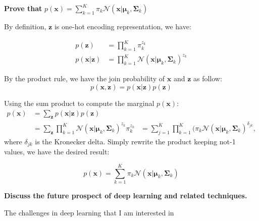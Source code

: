 \documentclass[12pt,twoside]{article}
\begin{document}
\begin{exercises}

\problem \textbf{Prove that} $p(\mathbf{x}) = \sum_{k=1}^{K} \pi_k \mathcal{N}(\mathbf{x}|\boldsymbol \mu_k,\boldsymbol \Sigma_k)$

\ifsolution \solution{}
By definition, $\mathbf{z}$ is one-hot encoding representation, we have:

\begin{equation*}
  \begin{aligned}
    p(\mathbf{z}) & = \prod^{K}_{k=1} \pi_k^{z_k} \\
    p(\mathbf{x}|\mathbf{z}) & = \prod^{K}_{k=1} \mathcal{N} (\mathbf{x}|\boldsymbol \mu_k, \boldsymbol \Sigma_k)^{z_k}
  \end{aligned}
\end{equation*}

By the product rule, we have the join probability of $\mathbf{x}$ and $\mathbf{z}$ as follow:
$$ p(\mathbf{x}, \mathbf{z}) = p(\mathbf{x}|\mathbf{z}) p(\mathbf{z}) $$

Using the sum product to compute the marginal $p(\mathbf{x})$:
\begin{equation*}
  \begin{aligned}
    p(\mathbf{x}) & = \sum_{\mathbf{z}} p(\mathbf{x}|\mathbf{z}) p(\mathbf{z})\\
                  & = \sum_{\mathbf{z}} \prod^{K}_{k=1} \mathcal{N} (\mathbf{x}|\boldsymbol \mu_k, \boldsymbol \Sigma_k)^{z_k} \pi_k^{z_k}
                  & = \sum_{j=1}^{K} \prod^{K}_{k=1} (\pi_k \mathcal{N}(\mathbf{x}|\boldsymbol \mu_k, \boldsymbol \Sigma_k)^{\delta_{jk}},
  \end{aligned}
\end{equation*}
where $\delta_{jk}$ is the Kronecker delta. Simply rewrite the product keeping not-1 values, we have the desired result:

$$ p(\mathbf{x}) = \sum_{k=1}^{K} \pi_k \mathcal{N}(\mathbf{x}|\boldsymbol \mu_k,\boldsymbol \Sigma_k) $$

\fi

\problem \textbf{Discuss the future prospect of deep learning and related techniques.}

\ifsolution \solution{}
The challenges in deep learning that I am interested in 

\fi


\end{exercises}
\end{document}

